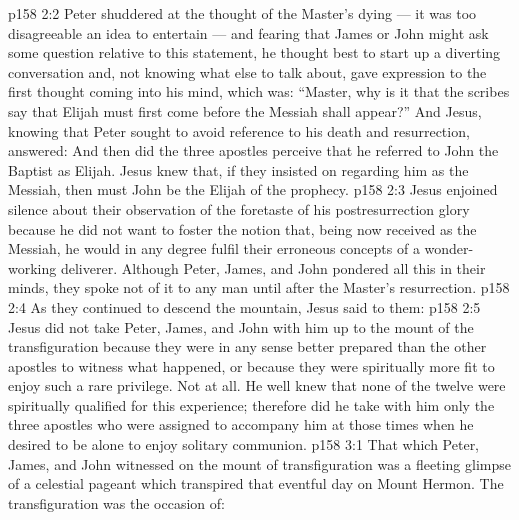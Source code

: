 \vs p158 2:2 Peter shuddered at the thought of the Master’s dying --- it was too disagreeable an idea to entertain --- and fearing that James or John might ask some question relative to this statement, he thought best to start up a diverting conversation and, not knowing what else to talk about, gave expression to the first thought coming into his mind, which was: “Master, why is it that the scribes say that Elijah must first come before the Messiah shall appear?” And Jesus, knowing that Peter sought to avoid reference to his death and resurrection, answered:  And then did the three apostles perceive that he referred to John the Baptist as Elijah. Jesus knew that, if they insisted on regarding him as the Messiah, then must John be the Elijah of the prophecy.
\vs p158 2:3 Jesus enjoined silence about their observation of the foretaste of his postresurrection glory because he did not want to foster the notion that, being now received as the Messiah, he would in any degree fulfil their erroneous concepts of a wonder\hyp{}working deliverer. Although Peter, James, and John pondered all this in their minds, they spoke not of it to any man until after the Master’s resurrection.
\vs p158 2:4 As they continued to descend the mountain, Jesus said to them: 
\vs p158 2:5 Jesus did not take Peter, James, and John with him up to the mount of the transfiguration because they were in any sense better prepared than the other apostles to witness what happened, or because they were spiritually more fit to enjoy such a rare privilege. Not at all. He well knew that none of the twelve were spiritually qualified for this experience; therefore did he take with him only the three apostles who were assigned to accompany him at those times when he desired to be alone to enjoy solitary communion.
\vs p158 3:1 That which Peter, James, and John witnessed on the mount of transfiguration was a fleeting glimpse of a celestial pageant which transpired that eventful day on Mount Hermon. The transfiguration was the occasion of:
